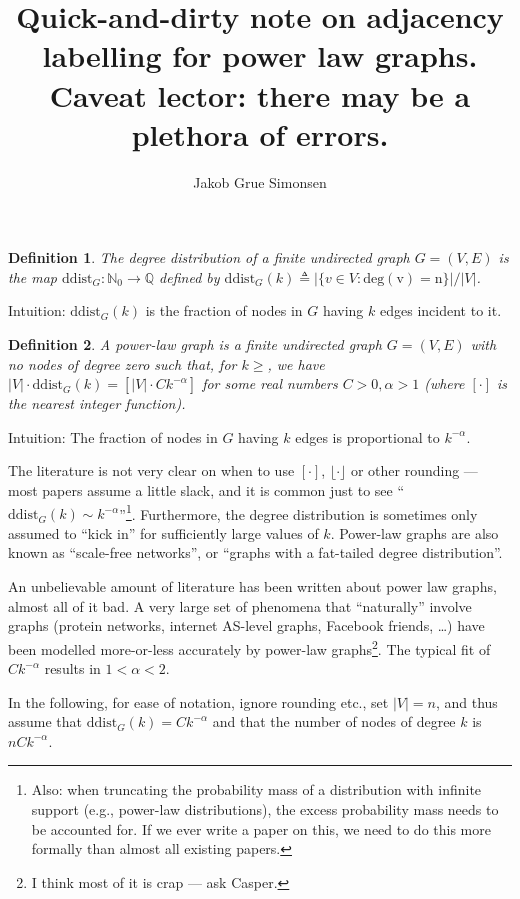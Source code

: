 \documentclass{article}
\title{Quick-and-dirty note on adjacency labelling  for power law graphs. Caveat lector: there may be a plethora of errors.}
\author{Jakob Grue Simonsen}
\newtheorem{definition}{Definition}
\begin{document}
\maketitle


\begin{definition}
The \emph{degree distribution} of a finite undirected graph $G = (V,E)$ is the map 
$\mathrm{ddist}_G : \mathbb{N}_0 \longrightarrow \mathbb{Q}$
defined by $\mathrm{ddist}_G (k) \triangleq 
\vert \{v \in V : \mathrm{deg(v) = n}\} \vert /\vert V \vert$.
\end{definition}

Intuition: $\mathrm{ddist}_G(k)$ is the fraction of nodes in $G$ having $k$ edges incident to it. 

\begin{definition}
A \emph{power-law graph} is a finite undirected graph $G = (V,E)$ with no nodes of degree zero
such that, for $k \geq $, we have $\vert V \vert \cdot \mathrm{ddist}_G(k) = [\vert V \vert \cdot C k^{-\alpha}]$ for some real numbers $C > 0,\alpha > 1$
(where $[\cdot]$ is the nearest integer function).
\end{definition}

Intuition: The fraction of nodes in $G$ having $k$ edges is proportional to $k^{-\alpha}$.

The literature is not very clear on when to use $[\cdot]$, $\lfloor \cdot \rfloor$ or other rounding --- most papers assume a little slack,
and it is common just to see ``$\mathrm{ddist}_G(k) \sim k^{-\alpha}$''\footnote{Also: when truncating the probability mass of a distribution with infinite support (e.g., power-law distributions), the excess probability mass needs to be accounted for. If we ever write a paper on this, we need to do this more formally than almost all existing papers.}. Furthermore,
the degree distribution is sometimes only assumed to ``kick in'' for sufficiently large values of $k$.
Power-law graphs are also known as ``scale-free networks'', or ``graphs with a fat-tailed degree distribution''.

An unbelievable amount of literature has been written about power law graphs, almost all of it bad. A very large
set of phenomena  that ``naturally'' involve graphs (protein networks, internet AS-level graphs, Facebook friends, \ldots) have been modelled more-or-less accurately by power-law graphs\footnote{I think most of it is crap --- ask Casper.}. The typical fit of $C k^{-\alpha}$ results in $1 < \alpha < 2$.

In the following, for ease of notation, ignore rounding etc., set $\vert V \vert = n$, and thus assume 
that $\mathrm{ddist}_G(k) = Ck^{-\alpha}$ and that the number of nodes of degree $k$ is
$n C k^{-\alpha}$.
\end{document}
